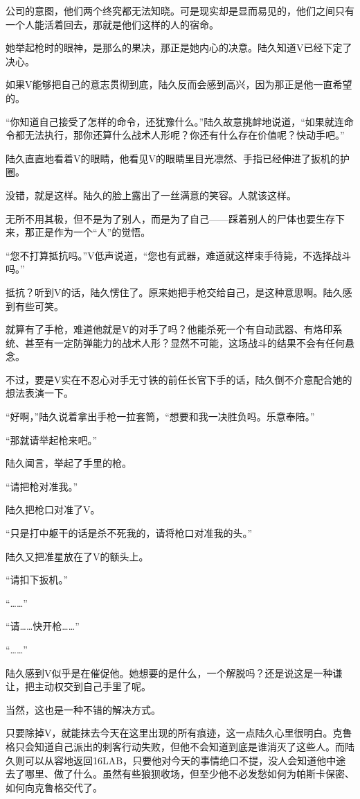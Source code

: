 公司的意图，他们两个终究都无法知晓。可是现实却是显而易见的，他们之间只有一个人能活着回去，那就是他们这样的人的宿命。

她举起枪时的眼神，是那么的果决，那正是她内心的决意。陆久知道V已经下定了决心。

如果V能够把自己的意志贯彻到底，陆久反而会感到高兴，因为那正是他一直希望的。

“你知道自己接受了怎样的命令，还犹豫什么。”陆久故意挑衅地说道，“如果就连命令都无法执行，那你还算什么战术人形呢？你还有什么存在价值呢？快动手吧。”

陆久直直地看着V的眼睛，他看见V的眼睛里目光凛然、手指已经伸进了扳机的护圈。

没错，就是这样。陆久的脸上露出了一丝满意的笑容。人就该这样。

无所不用其极，但不是为了别人，而是为了自己——踩着别人的尸体也要生存下来，那正是作为一个“人”的觉悟。

“您不打算抵抗吗。”V低声说道，“您也有武器，难道就这样束手待毙，不选择战斗吗。”

抵抗？听到V的话，陆久愣住了。原来她把手枪交给自己，是这种意思啊。陆久感到有些可笑。

就算有了手枪，难道他就是V的对手了吗？他能杀死一个有自动武器、有烙印系统、甚至有一定防弹能力的战术人形？显然不可能，这场战斗的结果不会有任何悬念。

不过，要是V实在不忍心对手无寸铁的前任长官下手的话，陆久倒不介意配合她的想法表演一下。

“好啊，”陆久说着拿出手枪一拉套筒，“想要和我一决胜负吗。乐意奉陪。”

“那就请举起枪来吧。”

陆久闻言，举起了手里的枪。

“请把枪对准我。”

陆久把枪口对准了V。

“只是打中躯干的话是杀不死我的，请将枪口对准我的头。”

陆久又把准星放在了V的额头上。

“请扣下扳机。”

“……”

“请……快开枪……”

“……”

陆久感到V似乎是在催促他。她想要的是什么，一个解脱吗？还是说这是一种谦让，把主动权交到自己手里了呢。

当然，这也是一种不错的解决方式。

只要除掉V，就能抹去今天在这里出现的所有痕迹，这一点陆久心里很明白。克鲁格只会知道自己派出的刺客行动失败，但他不会知道到底是谁消灭了这些人。而陆久则可以从容地返回16LAB，只要他对今天的事情绝口不提，没人会知道他中途去了哪里、做了什么。虽然有些狼狈收场，但至少他不必发愁如何为帕斯卡保密、如何向克鲁格交代了。


